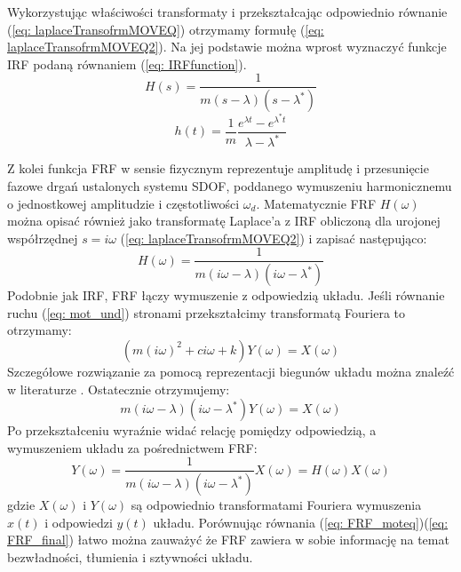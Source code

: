 Wykorzystując właściwości transformaty i przekształcając odpowiednio równanie (\ref{eq: laplaceTransofrmMOVEQ}) otrzymamy formułę (\ref{eq: laplaceTransofrmMOVEQ2}). Na jej podstawie można wprost wyznaczyć funkcje IRF podaną równaniem (\ref{eq: IRFfunction}).
\begin{equation} \label{eq: laplaceTransofrmMOVEQ2}
	H(s) = \frac{1}{m(s-\lambda)(s-\lambda^*)}
\end{equation}
\begin{equation} \label{eq: IRFfunction}
	h(t)=\frac{1}{m}\frac{e^{\lambda t}-e^{\lambda^*t}}{\lambda-\lambda^*}
\end{equation}



Z kolei funkcja FRF w sensie fizycznym reprezentuje amplitudę i przesunięcie fazowe drgań ustalonych systemu SDOF, poddanego wymuszeniu harmonicznemu o jednostkowej amplitudzie i częstotliwości $\omega_d$. Matematycznie FRF $H(\omega)$ można opisać również jako transformatę Laplace'a z IRF obliczoną dla urojonej współrzędnej $s=i\omega$ (\ref{eq: laplaceTransofrmMOVEQ2}) i zapisać następująco:
\begin{equation} \label{eq: FRFfunction}
	H(\omega)=\frac{1}{m(i\omega-\lambda)(i\omega-\lambda^*)}
\end{equation}
Podobnie jak IRF, FRF łączy wymuszenie z odpowiedzią układu. Jeśli równanie ruchu (\ref{eq: mot_und}) stronami przekształcimy transformatą Fouriera to otrzymamy:
\begin{equation} \label{eq: FRF_moteq}
	(m(i\omega)^2+ci\omega + k)Y(\omega)=X(\omega)
\end{equation}
Szczegółowe rozwiązanie za pomocą reprezentacji biegunów układu można znaleźć w literaturze \parencite{Brincker2015}. Ostatecznie otrzymujemy:
\begin{equation} 
	m(i\omega-\lambda)(i\omega-\lambda^*)Y(\omega)=X(\omega)
\end{equation}
Po przekształceniu wyraźnie widać relację pomiędzy odpowiedzią, a wymuszeniem układu za pośrednictwem FRF:
\begin{equation} \label{eq: FRF_final}
	Y(\omega)=\frac{1}{m(i\omega-\lambda)(i\omega-\lambda^*)}X(\omega)=H(\omega)X(\omega)
\end{equation}
gdzie $X(\omega)$ i $Y(\omega)$ są odpowiednio transformatami Fouriera wymuszenia $x(t)$ i odpowiedzi $y(t)$ układu. Porównując równania (\ref{eq: FRF_moteq})(\ref{eq: FRF_final}) łatwo można zauważyć że FRF zawiera w sobie informację na temat bezwładności, tłumienia i sztywności układu.




